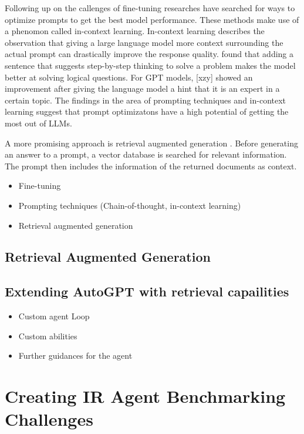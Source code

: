 \documentclass[english, version-2022-01]{uzl-thesis}
\begin{document}
Following up on the callenges of fine-tuning researches have searched for ways to optimize prompts to get the best model performance.
These methods make use of a phenomon called in-context learning.
In-context learning describes the observation that giving a large language model more context surrounding the actual prompt can drastically improve the response quality.
\cite{Wei2022} found that adding a sentence that suggests step-by-step thinking to solve a problem makes the model better at solving logical questions.
For GPT models, [xzy] showed an improvement after giving the language model a hint that it is an expert in a certain topic.
The findings in the area of prompting techniques and in-context learning suggest that prompt optimizatons have a high potential of getting the most out of LLMs.


A more promising approach is retrieval augmented generation \cite{Lewis2020}.
Before generating an answer to a prompt, a vector database is searched for relevant information.
The prompt then includes the information of the returned documents as context.

\begin{itemize}
	\item Fine-tuning
	\item Prompting techniques (Chain-of-thought, in-context learning)
	\item Retrieval augmented generation
\end{itemize}

\section{Retrieval Augmented Generation}


\section{Extending AutoGPT with retrieval capailities}

\begin{itemize}
	\item Custom agent Loop
	\item Custom abilities
	\item Further guidances for the agent
\end{itemize}

\chapter{Creating IR Agent Benchmarking Challenges}
\end{document}
